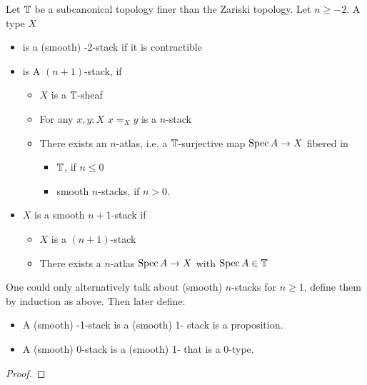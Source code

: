 \documentclass{article}
\begin{document}

\begin{definition}
Let $\mathbb{T}$ be a subcanonical topology finer than the Zariski topology. Let $n \ge -2$. A type $X$ 
    \begin{itemize}    
        \item is a  (smooth) -2-stack if it is contractible 
        \item is A  $(n+1)$-stack, if 
        \begin{itemize}
            \item $X$ is a $\mathbb{T}$-sheaf
            \item For any $x , y : X$ $x =_X y$ is a  $n$-stack
            \item There exists an $n$-atlas, i.e. a $\mathbb{T}$-surjective map $\operatorname{Spec} A \to X$ fibered in 
                \begin{itemize}
                    \item $\mathbb{T}$, if $n \le 0$
                    \item smooth $n$-stacks, if $ n > 0$. 
                \end{itemize}
        \end{itemize}
        \item $X$ is a smooth $n+1$-stack if
        \begin{itemize}
            \item $X$ is a  $(n+1)$-stack
            \item There exists a $n$-atlas $\operatorname{Spec} A \to X$ with $\operatorname{Spec} A \in \mathbb{T}$
        \end{itemize}
    \end{itemize}
    
\end{definition}
\begin{lemma}
One could only alternatively talk about  (smooth) $n$-stacks for $n \ge 1$, define them by induction as above. Then later define:
\begin{itemize}
     \item A  (smooth) -1-stack is a  (smooth) 1- stack is a proposition. \\
     \item A  (smooth) 0-stack is a  (smooth) 1-  that is a 0-type. \\    
\end{itemize}    
\end{lemma}
\begin{proof}
\end{proof}
\end{document}
